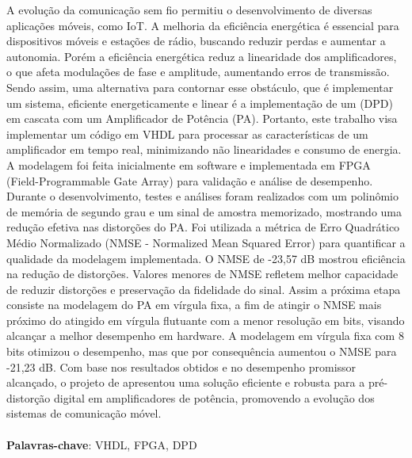 A evolução da comunicação sem fio permitiu o desenvolvimento de diversas aplicações móveis, como IoT. A melhoria da eficiência energética é essencial para dispositivos móveis e estações de rádio, buscando reduzir perdas e aumentar a autonomia. Porém a eficiência energética reduz a linearidade dos amplificadores, o que afeta modulações de fase e amplitude, aumentando erros de transmissão. Sendo assim, uma alternativa para contornar esse obstáculo, que é implementar um sistema, eficiente energeticamente e linear é a implementação de um (DPD) em cascata com um Amplificador de Potência (PA). Portanto, este trabalho visa implementar um código em VHDL para processar as características de um amplificador em tempo real, minimizando não linearidades e consumo de energia. A modelagem foi feita inicialmente em software e implementada em FPGA (Field-Programmable Gate Array) para validação e análise de desempenho. Durante o desenvolvimento, testes e análises foram realizados com um polinômio de memória de segundo grau e um sinal de amostra memorizado, mostrando uma redução efetiva nas distorções do PA. Foi utilizada a métrica de Erro Quadrático Médio Normalizado (NMSE - Normalized Mean Squared Error) para quantificar a qualidade da modelagem implementada. O NMSE de -23,57 dB mostrou eficiência na redução de distorções. Valores menores de NMSE refletem melhor capacidade de reduzir distorções e preservação da fidelidade do sinal. Assim a próxima etapa consiste na modelagem do PA em vírgula fixa, a fim de atingir o NMSE mais próximo do atingido em vírgula flutuante com a menor resolução em bits, visando alcançar a melhor desempenho em hardware. A modelagem em vírgula fixa com 8 bits otimizou o desempenho, mas que por consequência aumentou o NMSE para -21,23 dB. Com base nos resultados obtidos e no desempenho promissor alcançado, o projeto de apresentou uma solução eficiente e robusta para a pré-distorção digital em amplificadores de potência, promovendo a evolução dos sistemas de comunicação móvel.
\\
\\
\textbf{Palavras-chave}: VHDL, FPGA, DPD 
